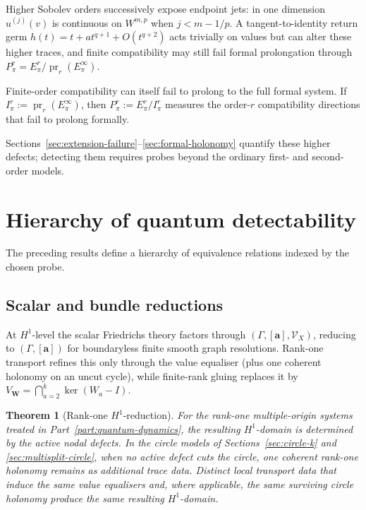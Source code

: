\documentclass[11pt]{article}
\theoremstyle{plain}
\newtheorem{theorem}{Theorem}[section]
\theoremstyle{definition}
\begin{document}
Higher Sobolev orders successively expose endpoint jets: in one dimension \(u^{(j)}(v)\) is continuous on \(W^{m,p}\) when \(j<m-1/p\). A tangent-to-identity return germ \(h(t)=t+a t^{q+1}+O(t^{q+2})\) acts trivially on values but can alter these higher traces, and finite compatibility may still fail formal prolongation through \(P_\pi^r=E_\pi^r/\operatorname{pr}_r(E_\pi^\infty)\).



Finite-order compatibility can itself fail to prolong to the full formal
system. If
\(I_\pi^r := \operatorname{pr}_r(E_\pi^\infty)\),
then \(P_\pi^r:=E_\pi^r/I_\pi^r\) measures the order-\(r\) compatibility directions that fail to prolong
formally.

Sections~\ref{sec:extension-failure}--\ref{sec:formal-holonomy} quantify these higher defects; detecting them requires probes beyond the ordinary first- and second-order models.

\section{Hierarchy of quantum detectability}
\label{sec:detectability-hierarchy}

The preceding results define a hierarchy of equivalence relations indexed by the chosen probe.

\subsection{Scalar and bundle reductions}
\label{subsec:detectability-data}
\label{subsec:detectability-scalar}
\label{subsec:detectability-measure}
\label{subsec:detectability-bundles}

At \(H^1\)-level the scalar Friedrichs theory factors through \((\Gamma,[\mathbf a],\mathcal V_X)\), reducing to \((\Gamma,[\mathbf a])\) for boundaryless finite smooth graph resolutions. Rank-one transport refines this only through the value equaliser (plus one coherent holonomy on an uncut cycle), while finite-rank gluing replaces it by \(V_{\mathbf W}=\bigcap_{a=2}^k\ker(W_a-I)\).



\begin{theorem}[Rank-one \(H^1\)-reduction]
\label{thm:rank-one-H1-bundle-reduction}
For the rank-one multiple-origin systems treated in
Part~\ref{part:quantum-dynamics}, the resulting \(H^1\)-domain is determined
by the active nodal defects. In the circle models of
Sections~\ref{sec:circle-k} and \ref{sec:multisplit-circle}, when no active
defect cuts the circle, one coherent rank-one holonomy remains as additional
trace data. Distinct local transport data that induce the same value
equalisers and, where applicable, the same surviving circle holonomy produce
the same resulting \(H^1\)-domain.
\end{theorem}
\end{document}
